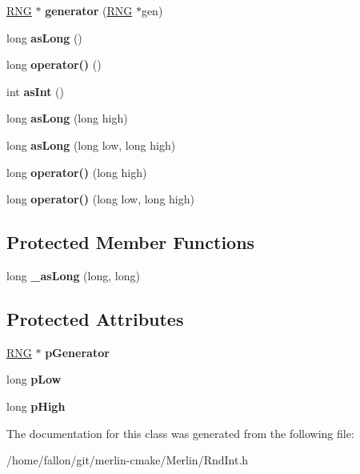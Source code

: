 \begin{DoxyCompactItemize}
\hyperlink{classRNG}{R\+NG} $\ast$ {\bfseries generator} (\hyperlink{classRNG}{R\+NG} $\ast$gen)
\item 
\mbox{\label{classRandomInteger_a379551dd6eef6d4ba935813d8ab69f03}} 
long {\bfseries as\+Long} ()
\item 
\mbox{\label{classRandomInteger_a17386b5a1a510b38da1bb4977dec7150}} 
long {\bfseries operator()} ()
\item 
\mbox{\label{classRandomInteger_ac3bd46e2b83a71efa13ac722bf650eb5}} 
int {\bfseries as\+Int} ()
\item 
\mbox{\label{classRandomInteger_a5854d231d62395b277d39f01fc19e137}} 
long {\bfseries as\+Long} (long high)
\item 
\mbox{\label{classRandomInteger_acadf46491f5a19eae4c7fed315b5909b}} 
long {\bfseries as\+Long} (long low, long high)
\item 
\mbox{\label{classRandomInteger_a557675ce051efe143dbfa7da60d08085}} 
long {\bfseries operator()} (long high)
\item 
\mbox{\label{classRandomInteger_a7beb936502f7d78c9989633a7594798e}} 
long {\bfseries operator()} (long low, long high)
\end{DoxyCompactItemize}
\subsection*{Protected Member Functions}
\begin{DoxyCompactItemize}
\item 
\mbox{\label{classRandomInteger_a9ecbdf03cb3f83d2941443ca1d3b8a13}} 
long {\bfseries \+\_\+as\+Long} (long, long)
\end{DoxyCompactItemize}
\subsection*{Protected Attributes}
\begin{DoxyCompactItemize}
\item 
\mbox{\label{classRandomInteger_abd81b1dfe06e2bf07bc6e4eec8631dd6}} 
\hyperlink{classRNG}{R\+NG} $\ast$ {\bfseries p\+Generator}
\item 
\mbox{\label{classRandomInteger_af7fd7ca1a4cdce7a53345e9eaac51c2f}} 
long {\bfseries p\+Low}
\item 
\mbox{\label{classRandomInteger_a25d33b15e038258bda61475d71583741}} 
long {\bfseries p\+High}
\end{DoxyCompactItemize}


The documentation for this class was generated from the following file\+:\begin{DoxyCompactItemize}
\item 
/home/fallon/git/merlin-\/cmake/\+Merlin/Rnd\+Int.\+h\end{DoxyCompactItemize}
